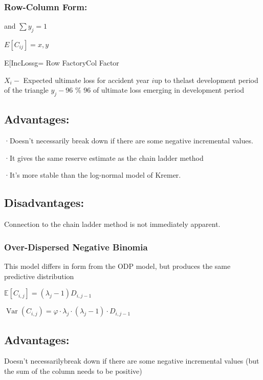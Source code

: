 \documentclass[
]{article}
\begin{document}
\subsubsection{Row-Column Form:}\label{row-column-form}

and \(\sum y_{j}=1\)

\(E[C_{ij}] = x,y\)

E{[}IncLossg= Row FactoryCol Factor

\(X_i-\) Expected ultimate loss for accident year \(i\)up to thelast
development period of the triangle \(y_{j}-96\) \% 96 of ultimate loss
emerging in development period

\subsection{Advantages:}\label{advantages-9}

·Doesn't necessarily break down if there are some negative incremental
values.

·It gives the same reserve estimate as the chain ladder method

·It's more stable than the log-normal model of Kremer.

\subsection{Disadvantages:}\label{disadvantages-7}

Connection to the chain ladder method is not immediately apparent.

\subsubsection{Over-Dispersed Negative
Binomia}\label{over-dispersed-negative-binomia}

This model differs in form from the ODP model, but produces the same
predictive distribution

\(\mathbb{E}\left[C_{i,j}\right]=\left(\lambda_j-1\right)D_{i,j-1}\)

\(\operatorname{Var}\left(C_{i,j}\right)=\varphi\cdot\lambda_j\cdot\left(\lambda_j-1\right)\cdot D_{i,j-1}\)

\subsection{Advantages:}\label{advantages-10}

Doesn't necessarilybreak down if there are some negative incremental
values (but the sum of the column needs to be positive)
\end{document}
